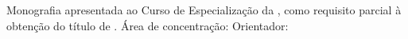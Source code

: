 \thispagestyle{empty}

\begin{center}
	\imprimirautor
\end{center}

\vspace{3cm}

\begin{center}
	\large \bfseries \imprimirtitulo
\end{center}

\vfill

\begin{flushright}
  \begin{minipage}[c]{.62\textwidth}
	Monografia apresentada ao Curso de Especialização da \imprimirinstituicao, como requisito parcial à obtenção do título de \pTitulacao.
	\newline \newline
	Área de concentração: \pAreaConcentracao
	\newline \newline
	Orientador: \imprimirorientador
  \end{minipage}
\end{flushright}

\vfill

\begin{center}
	{\imprimirlocal}
	
	{\imprimirinstituicao}
	
	{\imprimirdata}
\end{center}
